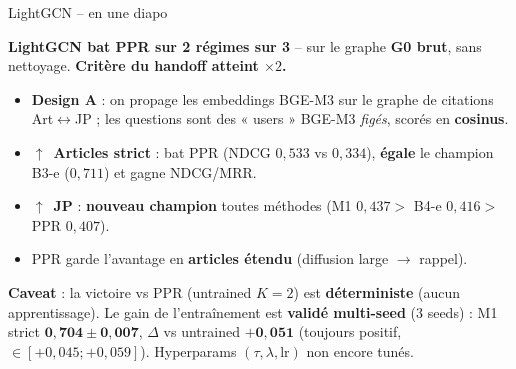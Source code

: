 \documentclass[aspectratio=169,10pt]{beamer}
\newcommand{\keybox}[1]{%
  \begin{center}
  \colorbox{accentsoft}{\parbox{0.92\linewidth}{\centering #1}}
  \end{center}}
\newcommand{\okbox}[1]{%
  \begin{center}
  \colorbox{green!10}{\parbox{0.92\linewidth}{\centering #1}}
  \end{center}}
\begin{document}
\begin{frame}{LightGCN -- en une diapo}
  \footnotesize
  \okbox{\textbf{LightGCN bat PPR sur 2 régimes sur 3} -- sur le graphe \textbf{G0 brut},
  sans nettoyage. \textbf{Critère du handoff atteint $\times 2$.}}

  \vspace{0.4em}
  \begin{itemize}\setlength{\itemsep}{0.15em}
    \item \textbf{Design A} : on propage les embeddings BGE-M3 sur le graphe de citations
    Art$\leftrightarrow$JP ; les questions sont des « users » BGE-M3 \emph{figés},
    scorés en \textbf{cosinus}.
    \item \textcolor{ok}{\textbf{$\uparrow$}}~\textbf{Articles strict} : bat PPR
    (NDCG $0{,}533$ vs $0{,}334$), \textbf{égale} le champion B3-e ($0{,}711$) et gagne
    NDCG/MRR.
    \item \textcolor{ok}{\textbf{$\uparrow$}}~\textbf{JP} : \textbf{nouveau champion}
    toutes méthodes (M1 $0{,}437 >$ B4-e $0{,}416 >$ PPR $0{,}407$).
    \item PPR garde l'avantage en \textbf{articles étendu} (diffusion large $\to$ rappel).
  \end{itemize}

  \vspace{0.4em}
  \keybox{\scriptsize \textbf{Caveat} : la victoire vs PPR (untrained $K{=}2$) est
  \textbf{déterministe} (aucun apprentissage). Le gain de l'entraînement
  est \textbf{validé multi-seed} (3 seeds) : M1 strict $\mathbf{0{,}704 \pm 0{,}007}$,
  $\Delta$ vs untrained $\mathbf{+0{,}051}$ (toujours positif, $\in [+0{,}045 ; +0{,}059]$).
  Hyperparams $(\tau, \lambda, \mathrm{lr})$ non encore tunés.}
\end{frame}
\end{document}
